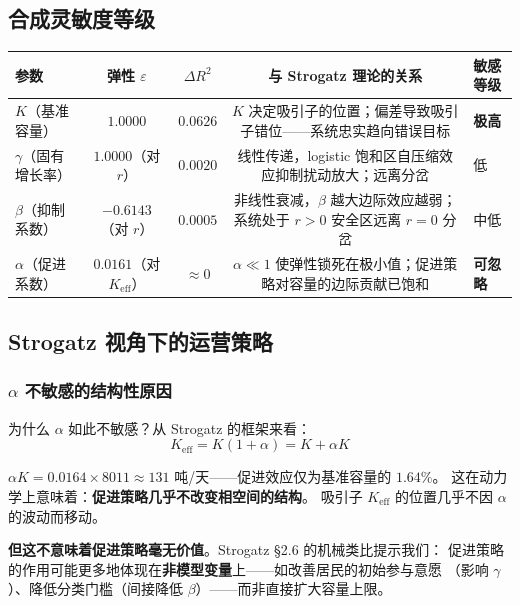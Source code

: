 \documentclass[12pt,a4paper]{article}
\begin{document}
\subsection{合成灵敏度等级}

\begin{center}
\begin{tabular}{lcccl}
\toprule
\textbf{参数} & \textbf{弹性 $\varepsilon$} & \textbf{$\Delta R^2$} &
\textbf{与 Strogatz 理论的关系} & \textbf{敏感等级} \\
\midrule
$K$（基准容量） & $1.0000$ & $0.0626$ &
$K$ 决定吸引子的位置；偏差导致吸引子错位——系统忠实趋向错误目标 &
\textbf{极高} \\[8pt]

$\gamma$（固有增长率） & $1.0000$（对 $r$） & $0.0020$ &
线性传递，logistic 饱和区自压缩效应抑制扰动放大；远离分岔 &
低 \\[8pt]

$\beta$（抑制系数） & $-0.6143$（对 $r$） & $0.0005$ &
非线性衰减，$\beta$ 越大边际效应越弱；系统处于 $r>0$ 安全区远离 $r=0$ 分岔 &
中低 \\[8pt]

$\alpha$（促进系数） & $0.0161$（对 $K_{\text{eff}}$） & $\approx 0$ &
$\alpha \ll 1$ 使弹性锁死在极小值；促进策略对容量的边际贡献已饱和 &
\textbf{可忽略} \\
\bottomrule
\end{tabular}
\end{center}

\subsection{Strogatz 视角下的运营策略}

\subsubsection{$\alpha$ 不敏感的结构性原因}
为什么 $\alpha$ 如此不敏感？从 Strogatz 的框架来看：
\begin{equation}
K_{\text{eff}} = K(1+\alpha) = K + \alpha K
\end{equation}

$\alpha K = 0.0164 \times 8011 \approx 131$ 吨/天——促进效应仅为基准容量的 $1.64\%$。
这在动力学上意味着：\textbf{促进策略几乎不改变相空间的结构}。
吸引子 $K_{\text{eff}}$ 的位置几乎不因 $\alpha$ 的波动而移动。

\textbf{但这不意味着促进策略毫无价值}。Strogatz \S2.6 的机械类比提示我们：
促进策略的作用可能更多地体现在\textbf{非模型变量}上——如改善居民的初始参与意愿
（影响 $\gamma$）、降低分类门槛（间接降低 $\beta$）——而非直接扩大容量上限。
\end{document}
